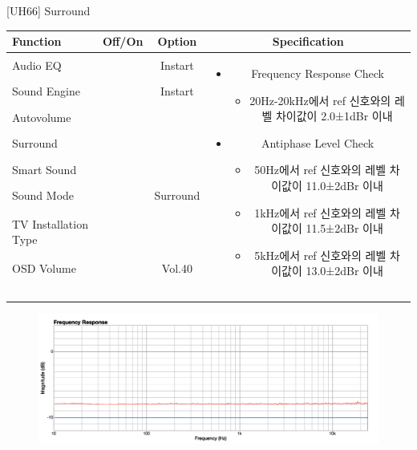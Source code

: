 \begin{frame}[t]{[UH66] Surround}
\begin{tiny}
\begin{tabular}{@{}lccc@{}}
\toprule
Function & Off/On & Option & Specification \\
\midrule
Audio EQ & \color{black}{Off} & Instart &
\multirow{10}{60mm}{
\begin{itemize}\vspace{-3mm}
\item Frequency Response Check
	\begin{itemize}
	\item 20Hz-20kHz에서 ref 신호와의 레벨 차이값이 2.0±1dBr 이내
	\end{itemize}
\item Antiphase Level Check
	\begin{itemize}
	\item 50Hz에서 ref 신호와의 레벨 차이값이 11.0±2dBr 이내
	\item 1kHz에서 ref 신호와의 레벨 차이값이 11.5±2dBr 이내
	\item 5kHz에서 ref 신호와의 레벨 차이값이 13.0±2dBr 이내
	\end{itemize}
\end{itemize}
} \\
Sound Engine & \color{blue}{On} & Instart & \\
Autovolume & \color{black}{Off} & & \\
Surround & \color{blue}{On} & & \\
Smart Sound & \color{black}{Off} & & \\
Sound Mode & \color{blue}{On} & Surround & \\
TV Installation Type & \color{blue}{On} & \color{black}{Standtype1} & \\
OSD Volume & \color{blue}{On} & Vol.40 & \\
& & & \\
& & & \\
& & & \\
& & & \\
\midrule
\end{tabular}
\end{tiny}

\begin{figure}[b]
\includegraphics[height=0.3\textwidth]{figures/surround.png}
\end{figure}

\end{frame}
